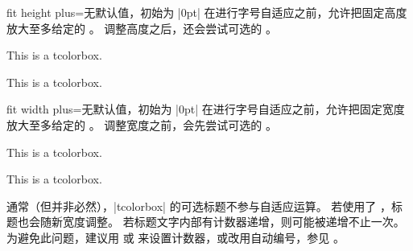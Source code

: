 \clearpage
\begin{docTcbKey}{fit height plus}{=}{无默认值，初始为 |0pt|}
  在进行字号自适应之前，允许把固定高度放大至多给定的 。
  调整高度之后，还会尝试可选的 。
\begin{dispExample}

\begin{tcolorbox}[fit]
This is a tcolorbox.
\end{tcolorbox}
\begin{tcolorbox}[fit,fit height plus=1cm]
This is a tcolorbox.
\end{tcolorbox}
\begin{tcolorbox}[fit]
\lipsum[2]
\end{tcolorbox}
\begin{tcolorbox}[fit,fit height plus=1cm]
\lipsum[2]
\end{tcolorbox}
\end{dispExample}
\end{docTcbKey}


\begin{docTcbKey}{fit width plus}{=}{无默认值，初始为 |0pt|}
  在进行字号自适应之前，允许把固定宽度放大至多给定的 。
  调整宽度之前，会先尝试可选的 。
  \enlargethispage*{1cm}
\begin{dispExample}

\begin{tcolorbox}[fit]
This is a tcolorbox.
\end{tcolorbox}
\begin{tcolorbox}[fit,fit width plus=1cm]
This is a tcolorbox.
\end{tcolorbox}
\begin{tcolorbox}[fit]
\lipsum[2]
\end{tcolorbox}
\begin{tcolorbox}[fit,fit width plus=1cm]
\lipsum[2]
\end{tcolorbox}
\end{dispExample}
\end{docTcbKey}


\begin{marker}
通常（但并非必然），|tcolorbox| 的可选标题不参与自适应运算。
若使用了 ，标题也会随新宽度调整。
若标题文字内部有计数器递增，则可能被递增不止一次。
为避免此问题，建议用  或 
来设置计数器，或改用自动编号，参见 。
\end{marker}


